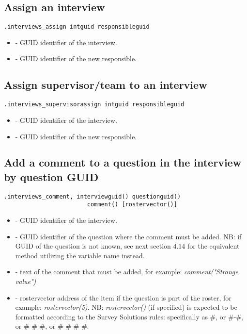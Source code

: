 \subsection{Assign an interview}
\begin{lstlisting}[style=CommandLineStyle]
.interviews_assign intguid responsibleguid
\end{lstlisting}
\paramsheader
\begin{itemize}
    \item {} - GUID identifier of the interview.
    \item {} - GUID identifier of the new responsible.
\end{itemize}

\subsection{Assign supervisor/team to an interview}
\begin{lstlisting}[style=CommandLineStyle]
.interviews_supervisorassign intguid responsibleguid
\end{lstlisting}
\paramsheader
\begin{itemize}
    \item {} - GUID identifier of the interview.
    \item {} - GUID identifier of the new responsible.
\end{itemize}


\subsection{Add a comment to a question in the interview by question GUID}
\begin{lstlisting}[style=CommandLineStyle]
.interviews_comment, interviewguid() questionguid()
                        comment() [rostervector()]
\end{lstlisting}
\optsheader
\begin{itemize}
    \item {} - GUID identifier of the interview.
    \item {} - GUID identifier of the question where the
           comment must be added. NB: if GUID of the question is not known,
           see next section 4.14 for the equivalent method utilizing the
           variable name instead.
    \item {} - text of the comment that must be added, for
           example: \textit{comment("Strange value")}
    \item {} - rostervector address of the item if the
           question is part of the roster, for example: \textit{rostervector(5)}.
           NB: \textit{rostervector()} (if specified) is expected to be
           formatted according to the Survey Solutions rules: specifically
           as \#, or \#-\#, or \#-\#-\#, or \#-\#-\#-\#.
\end{itemize}

